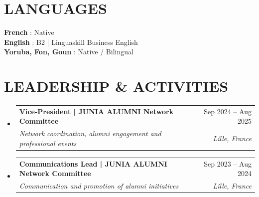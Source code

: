 \documentclass[a4paper,11pt]{article}
\makeatletter
\newcommand{\resumeSubheading}[4]{
  \vspace{1pt}\item
    \begin{tabular*}{0.97\textwidth}[t]{l@{\extracolsep{\fill}}r}
      {\color{primary}\textbf{#1}} & #2 \\
      \textit{\small#3} & \textit{\small #4} \\
    \end{tabular*}\vspace{-4pt}
}
\newcommand{\resumeSubHeadingListStart}{\begin{itemize}[leftmargin=0.15in, label={}]}
\newcommand{\resumeSubHeadingListEnd}{\end{itemize}}
\makeatother
\begin{document}
\section{LANGUAGES}
\begin{itemize}[leftmargin=0.15in, label={}]
  \small{\item{
   \textbf{French} : Native \vspace{1.5pt} \\
   \textbf{English} : B2 | Linguaskill Business English \vspace{1.5pt} \\
   \textbf{Yoruba, Fon, Goun} : Native / Bilingual
  }}
\end{itemize}

\section{LEADERSHIP \& ACTIVITIES}
\resumeSubHeadingListStart
  \resumeSubheading
    {Vice-President | JUNIA ALUMNI Network Committee}{Sep 2024 -- Aug 2025}
    {Network coordination, alumni engagement and professional events}{Lille, France}

  \resumeSubheading
    {Communications Lead | JUNIA ALUMNI Network Committee}{Sep 2023 -- Aug 2024}
    {Communication and promotion of alumni initiatives}{Lille, France}
\resumeSubHeadingListEnd
\end{document}
